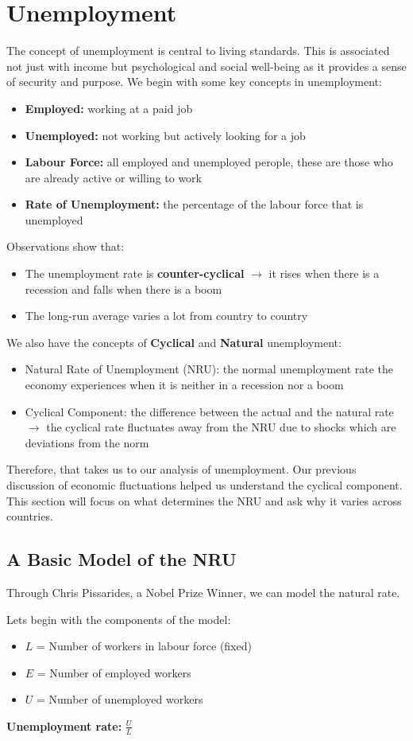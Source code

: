 \documentclass[12pt, letterpaper]{article}
\begin{document}
\section{Unemployment}
The concept of unemployment is central to living standards. This is associated not just with income but psychological and social well-being as it provides a sense of security and purpose. We begin with some key concepts in unemployment:
\begin{itemize}
	\item \textbf{Employed:} working at a paid job
	\item \textbf{Unemployed:} not working but actively looking for a job
	\item \textbf{Labour Force:} all employed and unemployed perople, these are those who are already active or willing to work
	\item \textbf{Rate of Unemployment:} the percentage of the labour force that is unemployed
\end{itemize}
Observations show that:
\begin{itemize}
	\item The unemployment rate is \textbf{counter-cyclical} $\rightarrow$ it rises when there is a recession and falls when there is a boom
	\item The long-run average varies a lot from country to country
\end{itemize}
We also have the concepts of \textbf{Cyclical} and \textbf{Natural} unemployment:
\begin{itemize}
	\item Natural Rate of Unemployment (NRU): the normal unemployment rate the economy experiences when it is neither in a recession nor a boom
	\item Cyclical Component: the difference between the actual and the natural rate $\rightarrow$ the cyclical rate fluctuates away from the NRU due to shocks which are deviations from the norm
\end{itemize}
Therefore, that takes us to our analysis of unemployment. Our previous discussion of economic fluctuations helped us understand the cyclical component. This section will focus on what determines the NRU and ask why it varies across countries.

\subsection{A Basic Model of the NRU}
Through Chris Pissarides, a Nobel Prize Winner, we can model the natural rate.
\begin{center}
	Lets begin with the components of the model:
	\begin{itemize}
		\item $L$ = Number of workers in labour force (fixed)
		\item $E$ = Number of employed workers
		\item $U$ = Number of unemployed workers
	\end{itemize}
	\textbf{Unemployment rate:} $\frac{U}{L}$
\end{center}
\end{document}
